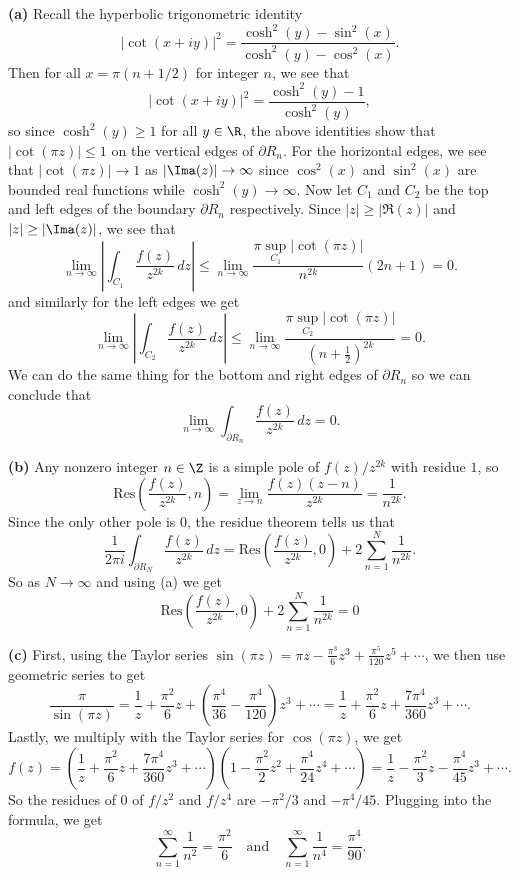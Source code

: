 \documentclass[11pt,letterpaper]{article}
\begin{document}
\begin{solution}
    \textbf{(a)} Recall the hyperbolic trigonometric identity
    \[
        |\cot(x+iy)|^2 = \frac{\cosh^2(y) -\sin^2(x)}{\cosh^2(y)-\cos^2(x)}.
    \] 
    Then for all $x=\pi(n+1/2)$ for integer $n$, we see that
    \[
        |\cot(x+iy)|^2 = \frac{\cosh^2(y)-1}{\cosh^2(y)},
    \] 
    so since  $\cosh^2(y)\geq 1$ for all $y\in \R$, the above identities show that $|\cot(\pi z)|\leq 1$ on the vertical edges of $\partial R_n$. For the horizontal edges, we see that $|\cot(\pi z)|\to 1$ as $|\Ima(z)|\to \infty$ since $\cos^2(x)$ and $\sin^2(x)$ are bounded real functions while $\cosh^2(y)\to \infty$. Now let $C_1$ and $C_2$ be the top and left edges of the boundary $\partial R_n$ respectively. Since $|z|\geq |\Re(z)|$ and $|z|\geq |\Ima(z)|$, we see that
    \[
        \lim_{n\to \infty}\left|\int_{C_1}\frac{f(z)}{z^{2k}}\,dz\right|\leq \lim_{n\to \infty}\frac{\pi \sup_{C_1}|\cot(\pi z)|}{n^{2k}}(2n+1)=0.
    \] 
    and similarly for the left edges we get
    \[
        \lim_{n\to \infty}\left|\int_{C_2}\frac{f(z)}{z^{2k}}\,dz\right|\leq \lim_{n\to \infty}\frac{\pi \sup_{C_2}|\cot(\pi z)|}{\left(n+\frac12\right)^{2k}}=0.
    \] 
    We can do the same thing for the bottom and right edges of $\partial R_n$ so we can conclude that
    \[
        \lim_{n\to \infty}\int_{\partial R_n} \frac{f(z)}{z^{2k}}\,dz = 0.
    \] 

    \textbf{(b)} Any nonzero integer $n\in \Z$ is a simple pole of $f(z)/z^{2k}$ with residue $1$, so 
    \[
        \textrm{Res}\left(\frac{f(z)}{z^{2k}}, n\right) = \lim_{z\to n}\frac{f(z)(z-n)}{z^{2k}}=\frac{1}{n^{2k}}.
    \] 
    Since the only other pole is $0$, the residue theorem tells us that
    \[
        \frac{1}{2\pi i}\int_{\partial R_N} \frac{f(z)}{z^{2k}}\,dz = \textrm{Res}\left(\frac{f(z)}{z^{2k}}, 0\right) + 2\sum^N_{n=1}\frac{1}{n^{2k}}.
    \] 
    So as $N\to \infty$ and using (a) we get
    \[
        \textrm{Res}\left(\frac{f(z)}{z^{2k}}, 0\right) + 2\sum^N_{n=1}\frac{1}{n^{2k}}=0
    \]

    \textbf{(c)} First, using the Taylor series $\sin(\pi z)=\pi z - \frac{\pi^3}{6}z^3 + \frac{\pi^5}{120}z^5+\cdots$, we then use geometric series to get
    \[
        \frac{\pi}{\sin(\pi z)} = \frac{1}{z}+\frac{\pi^2}{6}z+\left(\frac{\pi^4}{36}-\frac{\pi^4}{120}\right)z^3+\cdots=\frac{1}{z}+\frac{\pi^2}{6}z+\frac{7\pi^4}{360}z^3+\cdots.
    \] 
    Lastly, we multiply with the Taylor series for $\cos(\pi z)$, we get
    \[
        f(z)=\left(\frac{1}{z}+\frac{\pi^2}{6}z+\frac{7\pi^4}{360}z^3+\cdots\right)\left(1-\frac{\pi^2}{2}z^2+\frac{\pi^4}{24}z^4+\cdots\right)=\frac{1}{z}-\frac{\pi^2}{3}z-\frac{\pi^4}{45}z^3+\cdots.
    \] 
    So the residues of $0$ of $f/z^2$ and $f/z^4$ are $-\pi^2/3$ and $-\pi^4/45 $. Plugging into the formula, we get
    \[
        \sum^\infty_{n=1}\frac{1}{n^2}=\frac{\pi^2}{6}\quad\textrm{and}\quad\sum^\infty_{n=1}\frac{1}{n^4}=\frac{\pi^4}{90}.
    \] 
\end{solution}
\end{document}
